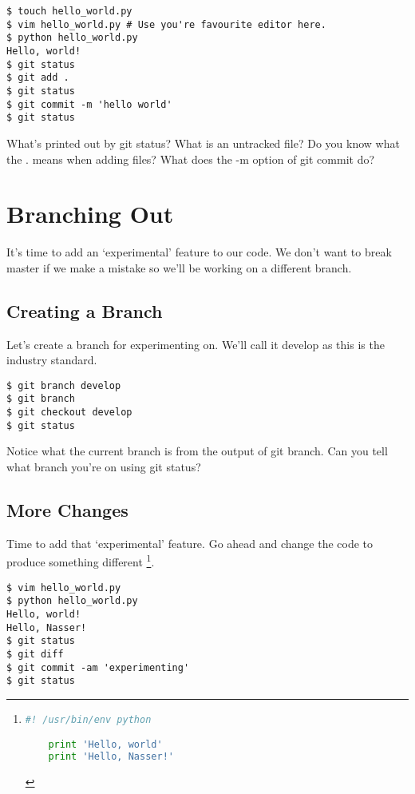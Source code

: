 \documentclass{tufte-handout}
\begin{document}
\begin{lstlisting}
$ touch hello_world.py
$ vim hello_world.py # Use you're favourite editor here.
$ python hello_world.py
Hello, world!
$ git status
$ git add .
$ git status
$ git commit -m 'hello world'
$ git status
\end{lstlisting}

What's printed out by git status? What is an untracked file? Do you know what
the . means when adding files? What does the -m option of git commit do?

\section{Branching Out}
\noindent It's time to add an `experimental' feature to our code. We don't
want to break master if we make a mistake so we'll be working on a different 
branch.

\subsection{Creating a Branch}

\noindent Let's create a branch for experimenting on. We'll call it develop as this is 
the industry standard.

\begin{lstlisting}
$ git branch develop
$ git branch
$ git checkout develop
$ git status
\end{lstlisting}

\noindent Notice what the current branch is from the output of git branch. Can
you tell what branch you're on using git status?

\subsection{More Changes}

\noindent Time to add that `experimental' feature. Go ahead and change the code to
produce something different \cprotect\footnote{
	\begin{lstlisting}[language=Python]
	#! /usr/bin/env python

	print 'Hello, world'
	print 'Hello, Nasser!'
	\end{lstlisting}
}.

\begin{lstlisting}
$ vim hello_world.py
$ python hello_world.py
Hello, world!
Hello, Nasser!
$ git status
$ git diff
$ git commit -am 'experimenting'
$ git status
\end{lstlisting}
\end{document}
